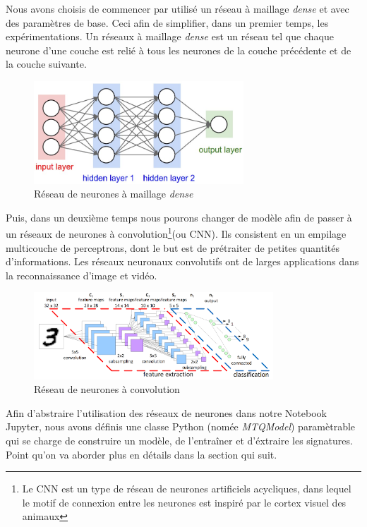 \documentclass[oneside,13pt,a4paper]{report}
\begin{document}
Nous avons choisis de commencer par utilisé un réseau à maillage \textit{dense} et avec des paramètres de base. Ceci afin de simplifier, dans un premier temps, les expérimentations. Un réseaux à maillage \textit{dense} est un réseau tel que chaque neurone d'une couche est relié à tous les neurones de la couche précédente et de la couche suivante.

\begin{figure}[!h]
	\center
	\includegraphics[width=0.7\textwidth]{img/ann-dense.jpg}
	\caption{Réseau de neurones à maillage \textit{dense}}
	\label{dense}
\end{figure}


Puis, dans un deuxième temps nous pourons changer de modèle afin de passer à un réseaux de neurones à convolution\footnote{Le CNN est un type de réseau de neurones artificiels acycliques, dans lequel le motif de connexion entre les neurones est inspiré par le cortex visuel des animaux}(ou CNN). Ils consistent en un empilage multicouche de perceptrons, dont le but est de prétraiter de petites quantités d'informations. Les réseaux neuronaux convolutifs ont de larges applications dans la reconnaissance d'image et vidéo.

\begin{figure}[!h]
	\center
	\includegraphics[width=0.8\textwidth]{img/cnn.png}
	\caption{Réseau de neurones à convolution}
\end{figure}

Afin d'abstraire l'utilisation des réseaux de neurones dans notre Notebook Jupyter, nous avons définis une classe Python (nomée \textit{MTQModel}) paramètrable qui se charge de construire un modèle, de l'entraîner et d'éxtraire les signatures. Point qu'on va aborder plus en détails dans la section qui suit.
\end{document}

